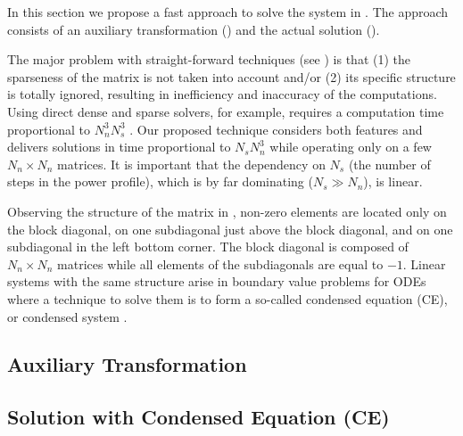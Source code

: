 In this section we propose a fast approach to solve the system in .
The approach consists of an auxiliary transformation () and
the actual solution ().

The major problem with straight-forward techniques (see )
is that (1) the sparseness of the matrix is not taken into account and/or (2)
its specific structure is totally ignored, resulting in inefficiency and
inaccuracy of the computations. Using direct dense and sparse solvers, for
example, requires a computation time proportional to $N_n^3 N_s^3$
\cite{press2007}. Our proposed technique considers both features and delivers
solutions in time proportional to $N_s N_n^3$ while operating only on a few $N_n
\times N_n$ matrices. It is important that the dependency on $N_s$ (the number
of steps in the power profile), which is by far dominating ($N_s \gg N_n$), is
linear.

Observing the structure of the matrix in , non-zero elements are
located only on the block diagonal, on one subdiagonal just above the block
diagonal, and on one subdiagonal in the left bottom corner. The block diagonal
is composed of $N_n \times N_n$ matrices while all elements of the subdiagonals
are equal to $-1$. Linear systems with the same structure arise in boundary
value problems for ODEs where a technique to solve them is to form a so-called
condensed equation (CE), or condensed system \cite{stoer2002}.

\subsection{Auxiliary Transformation}

\subsection{Solution with Condensed Equation (CE)}

